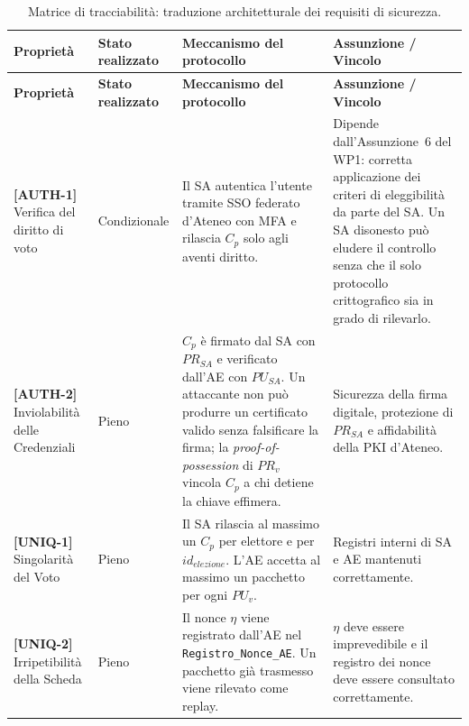\vspace{0.5cm}
\begin{longtable}{| p{2.4cm} | p{2.5cm} | p{5cm} | p{4.1cm} |}
    \caption{Matrice di tracciabilità: traduzione architetturale dei requisiti di sicurezza.}
    \label{tab:matrice_sicurezza} \\

    \hline
    \textbf{Proprietà}
    & \textbf{Stato realizzato}
    & \textbf{Meccanismo del protocollo}
    & \textbf{Assunzione / Vincolo} \\
    \hline
    \hline
    \endfirsthead

    \hline
    \textbf{Proprietà}
    & \textbf{Stato realizzato}
    & \textbf{Meccanismo del protocollo}
    & \textbf{Assunzione / Vincolo} \\
    \hline
    \hline
    \endhead

    \textbf{[AUTH-1]} \newline Verifica del diritto di voto
    & Condizionale
    & Il SA autentica l'utente tramite SSO federato d'Ateneo con MFA e rilascia $C_p$ solo agli aventi diritto.
    & Dipende dall'Assunzione~6 del WP1: corretta applicazione dei criteri di eleggibilità da parte del SA. Un SA disonesto può eludere il controllo senza che il solo protocollo crittografico sia in grado di rilevarlo. \\
    \hline

    \textbf{[AUTH-2]} \newline Inviolabilità delle Credenziali
    & Pieno
    & $C_p$ è firmato dal SA con $PR_{SA}$ e verificato dall'AE con $PU_{SA}$. Un attaccante non può produrre un certificato valido senza falsificare la firma; la \textit{proof-of-possession} di $PR_v$ vincola $C_p$ a chi detiene la chiave effimera.
    & Sicurezza della firma digitale, protezione di $PR_{SA}$ e affidabilità della PKI d'Ateneo. \\
    \hline

    \textbf{[UNIQ-1]} \newline Singolarità del Voto
    & Pieno
    & Il SA rilascia al massimo un $C_p$ per elettore e per $id_{elezione}$. L'AE accetta al massimo un pacchetto per ogni $PU_v$.
    & Registri interni di SA e AE mantenuti correttamente. \\
    \hline

    \textbf{[UNIQ-2]} \newline Irripetibilità della Scheda
    & Pieno
    & Il nonce $\eta$ viene registrato dall'AE nel \texttt{Registro\_Nonce\_AE}. Un pacchetto già trasmesso viene rilevato come replay.
    & $\eta$ deve essere imprevedibile e il registro dei nonce deve essere consultato correttamente. \\
    \hline


\end{longtable}
